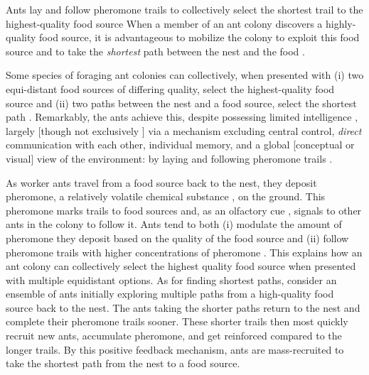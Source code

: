 \documentclass[11pt, oneside]{article}
\begin{document}
\begin{mybox}[label=box:ants, breakable]{Ants lay and follow pheromone trails to collectively select the shortest trail to the highest-quality food source}
When a member of an ant colony discovers a highly-quality food source, it is advantageous to mobilize the colony to exploit this food source \cite{deneubourg1983probabilistic} and to take the \emph{shortest} path between the nest and the food \cite{goss1989self}.

Some species of foraging ant colonies can collectively, when presented with
(i) two equi-distant food sources of differing quality, select the highest-quality food source \cite{beckers1993modulation} and
(ii) two paths between the nest and a food source, select the shortest path \cite{goss1989self}.
Remarkably, the ants achieve this, despite possessing limited intelligence \cite{edelstein1995trail}, largely [though not exclusively \cite{evison2008combined,czaczkes2015trail,robinson2005no}] via a mechanism excluding central control, \emph{direct} communication with each other, individual memory, and a global [conceptual or visual] view of the environment: by laying and following pheromone trails \cite{czaczkes2015trail}.

As worker ants travel from a food source back to the nest, they deposit pheromone, a relatively volatile chemical substance \cite{david2009trail}, on the ground. 
This pheromone marks trails to food sources and, as an olfactory cue \cite{knaden2016sensory}, signals to other ants in the colony to follow it. \cite{david2009trail,deneubourg1990self}
Ants tend to both 
(i) modulate the amount of pheromone they deposit based on the quality of the food source \cite{beckers1993modulation}
and
(ii) follow pheromone trails with higher concentrations of pheromone \cite{beckers1993modulation,czaczkes2015trail}. 
This explains how an ant colony can collectively select the highest quality food source when presented with multiple equidistant options. 
As for finding shortest paths, consider an ensemble of ants initially exploring multiple paths from a high-quality food source back to the nest.
The ants taking the shorter paths return to the nest and complete their pheromone trails sooner. These shorter trails then most quickly recruit new ants, accumulate pheromone, and get reinforced compared to the longer trails. By this positive feedback mechanism, ants are mass-recruited to take the shortest path from the nest to a food source. \cite{jackson2006communication,czaczkes2015trail,bonabeau1999swarm}


\end{mybox}
\end{document}
